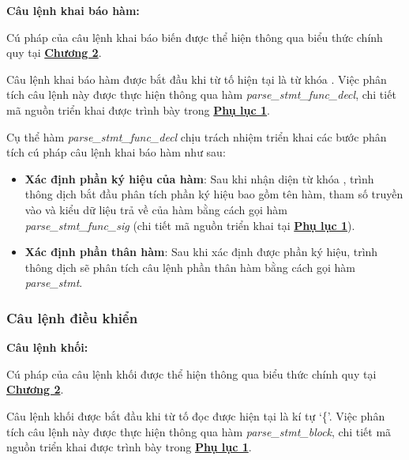 \textbf{Câu lệnh khai báo hàm:}

Cú pháp của câu lệnh khai báo biến được thể hiện thông qua biểu thức chính quy tại \hyperref[ch2:decl_var_stmt]{\bf Chương 2}.

Câu lệnh khai báo hàm được bắt đầu khi từ tố hiện tại là từ khóa . Việc phân tích câu lệnh này được thực hiện thông qua hàm \textit{parse\_stmt\_func\_decl}, chi tiết mã nguồn triển khai được trình bày trong \hyperref[ap1:stmt_decl_fun]{\bf Phụ lục 1}. %

Cụ thể hàm \textit{parse\_stmt\_func\_decl} chịu trách nhiệm triển khai các bước phân tích cú pháp câu lệnh khai báo hàm như sau:

\begin{itemize}
    \item \textbf{Xác định phần ký hiệu của hàm}: Sau khi nhận diện từ khóa , trình thông dịch bắt đầu phân tích phần ký hiệu bao gồm tên hàm, tham số truyền vào và kiểu dữ liệu trả về của hàm bằng cách gọi hàm \\\textit{parse\_stmt\_func\_sig} (chi tiết mã nguồn triển khai tại \hyperref[ap1:stmt_decl_fun_sig]{\bf Phụ lục 1}). %
    \item \textbf{Xác định phần thân hàm}: Sau khi xác định được phần ký hiệu, trình thông dịch sẽ phân tích câu lệnh phần thân hàm bằng cách gọi hàm \\\textit{parse\_stmt}.
\end{itemize}

\subsubsection{Câu lệnh điều khiển}

\textbf{Câu lệnh khối:}

Cú pháp của câu lệnh khối được thể hiện thông qua biểu thức chính quy tại \hyperref[ch2:block_stmt]{\bf Chương 2}.

Câu lệnh khối được bắt đầu khi từ tố đọc được hiện tại là kí tự `\{'. Việc phân tích câu lệnh này được thực hiện thông qua hàm \textit{parse\_stmt\_block}, chi tiết mã nguồn triển khai được trình bày trong \hyperref[ap1:stmt_block]{\bf Phụ lục 1}. %

        
